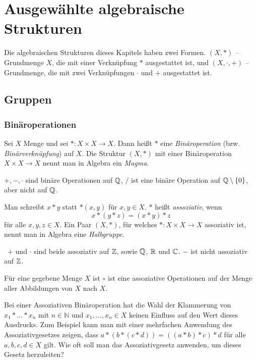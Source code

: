 \section{Ausgewählte algebraische Strukturen}

Die algebraischen Strukturen dieses Kapitels haben zwei Formen. $(X,\ast)$ -- Grundmenge $X$, die mit einer Verknüpfung $\ast$ ausgestattet ist, und $(X,\cdot, +)$ -- Grundmenge, die mit zwei Verknüpfungen $\cdot$ und $+$ ausgestattet ist. 

\subsection{Gruppen}

\subsubsection{Binäroperationen}

Sei $ X $ Menge und sei $ \ast : X \times X \to X $. Dann heißt $ \ast $ eine \emph{Binäroperation} (bzw. \emph{Binärverknüpfung}) auf $ X $.  Die Struktur $(X,\ast)$  mit einer Binäroperation $X \times X \to X$ nennt man in Algebra ein \emph{Magma}. 

\begin{bsp}
	$+, -, \cdot$ sind binäre Operationen auf $\mathbb Q$, $/$ ist eine binäre Operation auf $\mathbb Q \setminus \{0\}$, aber nicht auf $\mathbb Q$. 
\end{bsp} 

Man schreibt $ x \ast y $ statt $ \ast(x,y) $ für $ x,y \in X $. $ \ast $ heißt \emph{assoziativ}, wenn 
\[
	 x \ast ( y \ast z ) = ( x \ast y ) \ast z 
\] für alle $ x,y,z \in X $. Ein Paar $(X,\ast)$, für welches $\ast : X \times X \to X$ assoziativ ist, nennt man in Algebra eine \emph{Halbgruppe}. 

\begin{bsp}\ $+$ und $\cdot$ sind beide assoziativ auf $\mathbb Z$, sowie $\mathbb Q$, $\mathbb R$ und $\mathbb C$. $-$ ist nicht assoziativ auf $\mathbb Z$. 
	
	Für eine gegebene Menge $X$ ist $\circ$ ist eine assoziative Operationen auf der Menge aller Abbildungen von $X$ nach $X$. 
\end{bsp}

\begin{bem}
	Bei einer Assoziativen Binäroperation hat die Wahl der Klammerung von $ x_1 \ast \ldots \ast x_n $ mit $ n \in \mathbb N $ und $ x_1,\ldots,x_n \in X $ keinen Einfluss auf den Wert dieses Ausdrucks. Zum Beispiel kann man mit einer mehrfachen Anwendung des Assoziativgesetzes zeigen, dass  $a \ast (b \ast (c \ast d)) = ((a \ast b) \ast c) \ast d$ für alle $a,b,c,d \in X$ gilt. Wie oft soll man das Assoziativgesetz anwenden, um dieses Gesetz herzuleiten? 
\end{bem}

